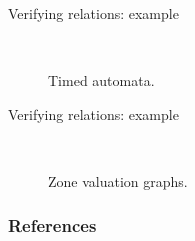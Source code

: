 \documentclass{beamer}
\begin{document}
\begin{frame}[shrink=20]{Verifying relations: example}

\begin{figure}%
\centering
{}\qquad
{}\\
\caption{Timed automata.}
\label{pair03}
\end{figure}

\end{frame}

\begin{frame}[shrink=40]{Verifying relations: example}

\begin{figure}%
\centering
{}\qquad
{}\\
\caption{Zone valuation graphs.}
\label{pair03}
\end{figure}

\end{frame}

\begin{frame}[allowframebreaks]
  \frametitle{References}
  
  
\end{frame}
\end{document}

